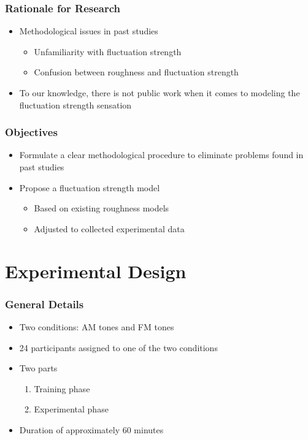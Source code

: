 \documentclass{beamer}
\begin{document}
\begin{frame}
  \frametitle{Rationale for Research}
  \begin{itemize}
    \item Methodological issues in past studies
    \pause{}
    \begin{itemize}
      \item Unfamiliarity with fluctuation strength
      \pause{}
      \item Confusion between roughness and fluctuation strength
    \end{itemize}
    \pause{}
    \item To our knowledge, there is not public work when it comes to modeling
      the fluctuation strength sensation
  \end{itemize}
\end{frame}

\begin{frame}
  \frametitle{Objectives}
  \begin{itemize}
    \item Formulate a clear methodological procedure to eliminate problems
      found in past studies
    \pause{}
    \item Propose a fluctuation strength model
    \pause{}
    \begin{itemize}
      \item Based on existing roughness models
      \pause{}
      \item Adjusted to collected experimental data
    \end{itemize}
  \end{itemize}
\end{frame}

\section{Experimental Design}

\begin{frame}
  \frametitle{General Details}
  \begin{itemize}
    \item Two conditions: AM tones and FM tones
    \pause{}
    \item 24 participants assigned to one of the two conditions
    \pause{}
    \item Two parts
      \begin{enumerate}
        \item Training phase
        \item Experimental phase
      \end{enumerate}
    \pause{}
    \item Duration of approximately 60 minutes
  \end{itemize}
\end{frame}
\end{document}
